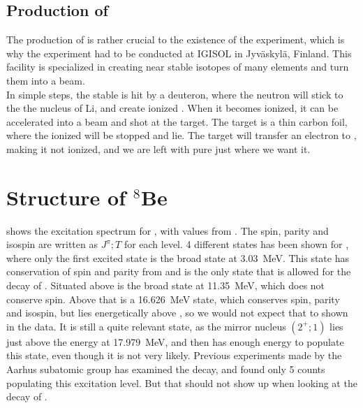 \subsection{Production of \li}
The production of \li is rather crucial to the existence of the experiment, which is why the experiment had to be conducted at IGISOL in Jyväskylä, Finland. This facility is specialized in creating near stable isotopes of many elements and turn them into a beam. \\
In simple steps, the stable  is hit by a deuteron, where the neutron will stick to the the nucleus of \isotope[7]Li, and create ionized \li. When it becomes ionized, it can be accelerated into a beam and shot at the target. The target is a thin carbon foil, where the ionized \li will be stopped and lie. The target will transfer an electron to \li, making it not ionized, and we are left with pure \li just where we want it.  

\section{Structure of $^8$Be}
 shows the excitation spectrum for \ber, with values from \cite{TILLEY2004155}. The spin, parity and isospin are written as $J^\pi ; T$ for each level. 4 different states has been shown for \ber, where only the first excited state is the broad state at \SI{3.03}{MeV}. This state has conservation of spin and parity from \li and is the only state that is allowed for the decay of \li. Situated above is the broad state at \SI{11.35}{MeV}, which does not conserve spin. Above that is a \SI{16.626}{MeV} state, which conserves spin, parity and isospin, but lies energetically above \li, so we would not expect that to shown in the data. It is still a quite relevant state, as the mirror nucleus  $(2^+; 1)$ lies just above the energy at \SI{17.979}{MeV}, and then has enough energy to populate this state, even though it is not very likely. Previous experiments made by the Aarhus subatomic group has examined the decay, and found only 5 counts populating this excitation level. But that should not show up when looking at the decay of \li.


